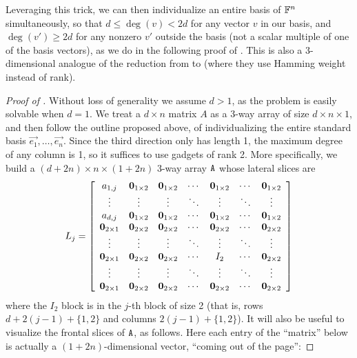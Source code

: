 Leveraging this trick, we can then individualize an entire basis of $\mathbb{F}^n$ 
simultaneously, so that $d \leq \deg(v) < 2d$ for any vector $v$ in our basis, and 
$\deg(v') \geq 2d$ for any nonzero $v'$ outside the basis   
(not a scalar multiple of one of the basis vectors), as we do in the following 
proof of . 
This is 
also a 3-dimensional analogue of the reduction from \GI to \CodeEq \cite{Luks,miyazakiCodeEq,PR97} 
(where they use Hamming weight instead of rank).

\begin{proof}[Proof of ]
Without loss of generality we assume $d>1$, as the problem is easily solvable when $d=1$. 
We treat a $d \times n$ matrix $A$ as a 3-way array of size $d \times n \times 1$, 
and then follow the outline proposed above, of individualizing the entire standard 
basis $\vec{e_1}, \dotsc, \vec{e_n}$. Since the third direction only has length 1, 
the maximum degree of any column is 1, so it suffices to use gadgets of rank 2. 
More specifically, 
we build a $(d + 2n) \times n \times (1 + 2n)$ 3-way array $\mathtt{A}$ whose lateral slices are
\[
L_j = \left[\begin{array}{ccccccc}
a_{1,j} & \mathbf{0}_{1 \times 2} & \mathbf{0}_{1 \times 2} & \cdots & \mathbf{0}_{1 \times 2} & \cdots & \mathbf{0}_{1 \times 2} \\
\vdots & \vdots & \vdots & \ddots & \vdots & \ddots & \vdots\\
a_{d,j} & \mathbf{0}_{1 \times 2} & \mathbf{0}_{1 \times 2} & \cdots & \mathbf{0}_{1 \times 2}  & \cdots & \mathbf{0}_{1 \times 2} \\
\mathbf{0}_{2 \times 1} & \mathbf{0}_{2 \times 2} & \mathbf{0}_{2 \times 2} & \cdots & \mathbf{0}_{2 \times 2}  & \cdots & \mathbf{0}_{2 \times 2} \\
\vdots & \vdots & \vdots & \ddots & \vdots & \ddots & \vdots \\
\mathbf{0}_{2 \times 1} & \mathbf{0}_{2 \times 2} & \mathbf{0}_{2 \times 2} & \cdots & I_2 & \cdots & \mathbf{0}_{2 \times 2} \\
\vdots & \vdots & \vdots & \ddots & \vdots & \ddots & \vdots \\
\mathbf{0}_{2 \times 1} & \mathbf{0}_{2 \times 2} & \mathbf{0}_{2 \times 2} & \cdots & \mathbf{0}_{2 \times 2}  & \cdots & \mathbf{0}_{2 \times 2} \\
\end{array}\right]
\]
where the $I_2$ block is in the $j$-th block of size 2 (that is, rows $d + 2(j-1) + \{1,2\}$ and columns $2(j-1) + \{1,2\}$).
It will also be useful to visualize the frontal slices of $\mathtt{A}$, as follows. Here each entry of the ``matrix'' below is actually a $(1+2n)$-dimensional vector, ``coming out of the page'':

\end{proof}
